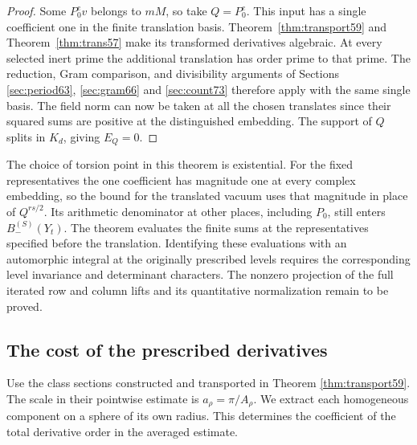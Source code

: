 \documentclass[a4paper,11pt]{article}
\theoremstyle{definition}
\theoremstyle{remark}
\numberwithin{equation}{section}
\begin{document}
\begin{proof}
Some \(P_0^e v\) belongs to \(mM\), so take \(Q=P_0^e\).
This input has a single coefficient one in the finite
translation basis. Theorem~\ref{thm:transport59} and
Theorem~\ref{thm:trans57} make its transformed derivatives
algebraic. At every selected inert prime the additional
translation has order prime to that prime. The reduction,
Gram comparison, and divisibility arguments of Sections
\ref{sec:period63}, \ref{sec:gram66} and \ref{sec:count73}
therefore apply with the same single basis. The field norm
can now be taken at all the chosen translates since their
squared sums are positive at the distinguished embedding.
The support of \(Q\) splits in \(K_d\), giving \(E_Q=0\).
\end{proof}

The choice of torsion point in this theorem is existential.
For the fixed representatives the one coefficient has magnitude
one at every complex embedding, so the bound for the translated
vacuum uses that magnitude in place of \(Q^{rs/2}\).
Its arithmetic denominator at other places, including \(P_0\),
still enters \(B_-^{(S)}(Y_t)\). The theorem evaluates the
finite sums at the representatives specified before the
translation. Identifying these evaluations with an automorphic
integral at the originally prescribed levels requires the
corresponding level invariance and determinant characters.
The nonzero projection of the full iterated row and column
lifts and its quantitative normalization remain to be proved.

\subsection{The cost of the prescribed derivatives}\label{nav:V-22}
Use the class sections constructed and transported in
Theorem \ref{thm:transport59}.
The scale in their pointwise estimate is \(a_\rho=\pi/A_\rho\).
We extract each homogeneous component on a sphere of its own
radius. This determines the coefficient of the total derivative
order in the averaged estimate.
\end{document}
